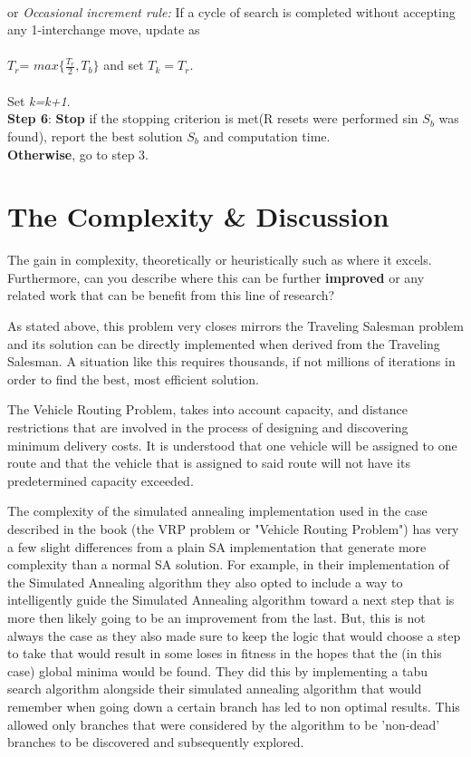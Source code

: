 \documentclass[11pt]{article}
\newcommand{\<}{\langle}
\renewcommand{\>}{\rangle}
\theoremstyle{definition}
\begin{document}
    \\or \textit{Occasional increment rule:} If a cycle of search is completed without accepting any 1-interchange move, update as\\
    \\ $T_{r}$= $max \bigg\{\frac{T_{r}}{2}, T_{b}\bigg\}$ and set $T_{k}=T_{r}$.\\
    \\Set \textit{k=k+1}.
    \\\textbf{Step 6}: \textbf{Stop} if the stopping criterion is met(R resets were performed sin \textit{$S_{b}$} was found), report the best solution \textit{$S_{b}$} and computation time. \\
    \textbf{Otherwise}, go to step 3.
    \\
    \section{The Complexity \& Discussion}
    The gain in complexity, theoretically or heuristically such as where it excels. Furthermore, can you describe where this can be further \textbf{improved} or any related work that can be benefit from this line of research? 
    
    
    As stated above, this problem very closes mirrors the Traveling Salesman problem and its solution can be directly implemented when derived from the Traveling Salesman. A situation like this requires thousands, if not millions of iterations in order to find the best, most efficient solution. 
    
    
    The Vehicle Routing Problem, takes into account capacity, and distance restrictions that are involved in the process of designing and discovering minimum delivery costs. It is understood that one vehicle will be assigned to one route and that the vehicle that is assigned to said route will not have its predetermined capacity exceeded. 
    
    The complexity of the simulated annealing implementation used in the case described in the book (the VRP problem or "Vehicle Routing Problem") has very a few slight differences from a plain SA implementation that generate more complexity than a normal SA solution. For example, in their implementation of the Simulated Annealing algorithm they also opted to include a way to intelligently guide the Simulated Annealing algorithm toward a next step that is more then likely going to be an improvement from the last. But, this is not always the case as they also made sure to keep the logic that would choose a step to take that would result in some loses in fitness in the hopes that the (in this case) global minima would be found. They did this by implementing a tabu search algorithm alongside their simulated annealing algorithm that would remember when going down a certain branch has led to non optimal results. This allowed only branches that were considered by the algorithm to be 'non-dead' branches to be discovered and subsequently explored.
    
\end{document}
